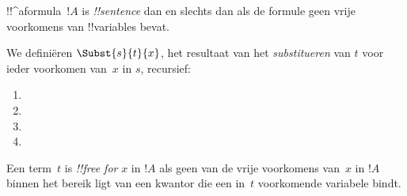 \documentclass[openany]{memoir}
\begin{document}
\begin{defn}[Zin]
!!^a{formula}~$!A$ is  \emph{!!{sentence}} dan en
slechts dan als de formule geen vrije voorkomens van !!{variable}s bevat.
\end{defn}

\endgroup

\begingroup
\def\olfilename{OLP-0158}
\def\olfilepath{content/first-order-logic/syntax-and-semantics/}
\hypertarget{unit-OLP-0158}{}





\begin{defn}
We definiëren $\Subst{s}{t}{x}$, het resultaat van het
\emph{substitueren} van $t$ voor ieder voorkomen van~$x$ in $s$,
recursief:
\begin{enumerate}
\item {}

\item {}

\item {}

\item{}
\end{enumerate}
\end{defn}

\begin{defn}
Een term~$t$ is \emph{!!{free for}} $x$ in $!A$ als geen van de vrije
voorkomens van~$x$ in $!A$ binnen het bereik ligt van een kwantor die
een in~$t$ voorkomende variabele bindt.
\end{defn}
\end{document}
